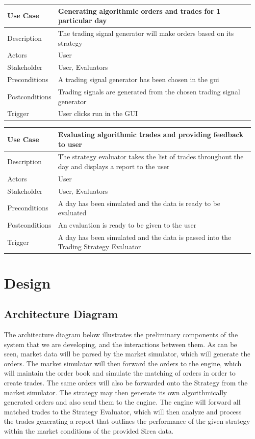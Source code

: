 \documentclass{article}
\begin{document}
\begin{tabular}{|p{1in}|p{3in}|}
\hline
Use Case & Generating algorithmic orders and trades for 1 particular day\\\hline
Description & The trading signal generator will make orders based on its strategy\\
Actors & User\\
Stakeholder & User, Evaluators\\
Preconditions & A trading signal generator has been chosen in the gui\\
Postconditions & Trading signals are generated from the chosen trading signal generator\\
Trigger & User clicks run in the GUI\\
\hline
\end{tabular}

\begin{tabular}{|p{1in}|p{3in}|}
\hline
Use Case & Evaluating algorithmic trades and providing feedback to user\\\hline
Description & The strategy evaluator takes the list of trades throughout the day and displays a report to the user\\
Actors & User\\
Stakeholder & User, Evaluators\\
Preconditions & A day has been simulated and the data is ready to be evaluated\\
Postconditions & An evaluation is ready to be given to the user\\
Trigger & A day has been simulated and the data is passed into the Trading Strategy Evaluator\\
\hline
\end{tabular}


\section{Design}
\subsection{Architecture Diagram}

The architecture diagram below illustrates the preliminary components of the system that we are developing, and the interactions between them. As can be seen, market data will be parsed by the market simulator, which will generate the orders. The market simulator will then forward the orders to the engine, which will maintain the order book and simulate the matching of orders in order to create trades. The same orders will also be forwarded onto the Strategy from the market simulator. The strategy may then generate its own algorithmically generated orders and also send them to the engine. The engine will forward all matched trades to the Strategy Evaluator, which will then analyze and process the trades generating a report that outlines the performance of the given strategy within the market conditions of the provided Sirca data.
\end{document}
